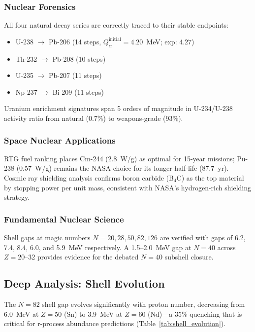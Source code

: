 \documentclass[letterpaper,11pt]{article}
\begin{document}
\subsubsection{Nuclear Forensics}

All four natural decay series are correctly traced to their stable endpoints:
\begin{itemize}
\item U-238 $\to$ Pb-206 (14 steps, $Q_\alpha^\text{initial} = 4.20$~MeV; exp: 4.27)
\item Th-232 $\to$ Pb-208 (10 steps)
\item U-235 $\to$ Pb-207 (11 steps)
\item Np-237 $\to$ Bi-209 (11 steps)
\end{itemize}
Uranium enrichment signatures span 5 orders of magnitude in U-234/U-238
activity ratio from natural (0.7\%) to weapons-grade (93\%).

\subsubsection{Space Nuclear Applications}

RTG fuel ranking places Cm-244 (2.8~W/g) as optimal for 15-year missions;
Pu-238 (0.57~W/g) remains the NASA choice for its longer half-life (87.7~yr).
Cosmic ray shielding analysis confirms boron carbide (B$_4$C) as the top
material by stopping power per unit mass, consistent with NASA's hydrogen-rich
shielding strategy.

\subsubsection{Fundamental Nuclear Science}

Shell gaps at magic numbers $N = 20, 28, 50, 82, 126$ are verified with gaps of
6.2, 7.4, 8.4, 6.0, and 5.9~MeV respectively. A 1.5--2.0~MeV gap at $N = 40$
across $Z = 20$--32 provides evidence for the debated $N = 40$ subshell closure.

\subsection{Deep Analysis: Shell Evolution}

The $N = 82$ shell gap evolves significantly with proton number, decreasing from
6.0~MeV at $Z = 50$ (Sn) to 3.9~MeV at $Z = 60$ (Nd)---a 35\% quenching that
is critical for r-process abundance predictions (Table~\ref{tab:shell_evolution}).
\end{document}
